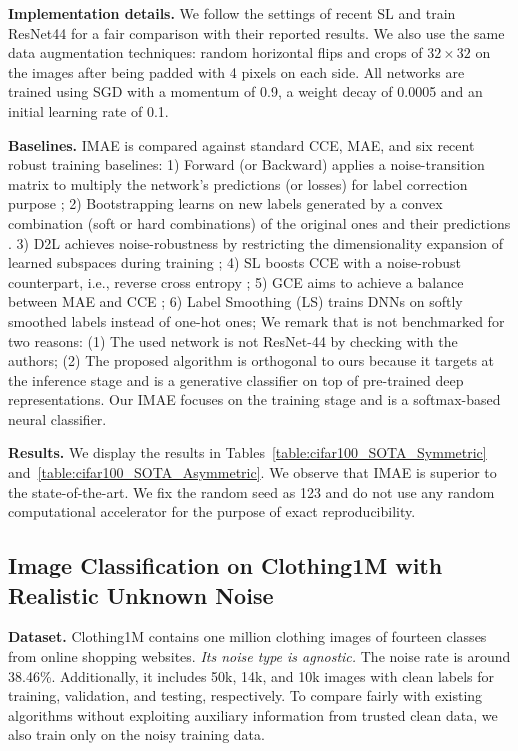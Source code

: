 \documentclass{article}
\begin{document}
\textbf{Implementation details.} 
We follow the settings of recent SL \cite{wang2019symmetric} and train ResNet44 \cite{he2016deep} for a fair comparison with their reported results.
We also use the same data augmentation techniques: random horizontal flips and crops of $32\times 32$ on the images after being padded with 4 pixels on each side.
All networks are trained using SGD with a momentum of 0.9, a weight decay of 0.0005 and an initial learning rate of 0.1.

\textbf{Baselines.} IMAE is compared against standard CCE, MAE, and six recent robust training baselines: 
1) Forward (or Backward) applies a noise-transition matrix to multiply the network's predictions (or losses) for label correction purpose \citep{patrini2017making}; 
2) Bootstrapping learns on new labels generated by a convex combination (soft or hard combinations) of the original ones and their predictions \citep{reed2015training}.  
3) D2L achieves noise-robustness by restricting the dimensionality expansion of learned subspaces during training \citep{ma2018dimensionality};  
4) SL boosts CCE with a noise-robust counterpart, i.e., reverse cross entropy \citep{wang2019symmetric};
5) GCE aims to achieve a balance between MAE and CCE \cite{zhang2018generalized};
6) Label Smoothing (LS) trains DNNs on softly smoothed labels instead of one-hot ones;  
We remark that \cite{lee2019robust} is not benchmarked for two reasons: (1) The used network is not ResNet-44 by checking with the authors; (2) The proposed algorithm is orthogonal to ours because it targets at the inference stage and is a generative classifier on top of pre-trained deep representations. Our IMAE focuses on the training stage and is a softmax-based neural classifier. 

\textbf{Results.} 
We display the results in Tables~\ref{table:cifar100_SOTA_Symmetric} and~\ref{table:cifar100_SOTA_Asymmetric}.
We observe that IMAE is superior to the state-of-the-art. We fix the random seed as 123 and do not use any random computational accelerator for the purpose of exact reproducibility.











\subsection{Image Classification on Clothing1M with Realistic Unknown Noise}
\label{sec:clothing1M_SOTA}
\noindent
\textbf{Dataset.} Clothing1M \cite{xiao2015learning} contains one million clothing images of fourteen classes from online shopping websites. \textit{Its noise type is agnostic.} 
The noise rate is around 38.46\%.
Additionally, it includes 50k, 14k, and 10k images with clean labels for training, validation, and testing, respectively. To compare fairly with existing algorithms without exploiting auxiliary information from trusted clean data, we also train only on the noisy training data.
\end{document}
